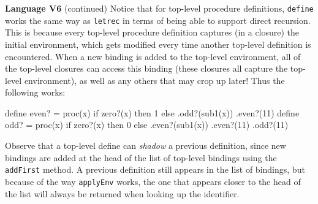 \begin{minipage}[t]{\sw}
\slidenumber
\LARGE
{\bf Language V6} (continued)\exx
Notice that for top-level procedure definitions,
\verb'define' works the same way as \verb'letrec'
in terms of being able to support direct recursion.
This is because every top-level procedure definition captures
(in a closure)
the initial environment,
which gets modified every time another top-level definition is encountered.
When a new binding is added to the top-level environment,
all of the top-level closures can access this binding
(these closures all capture the top-level environment),
as well as any others that may crop up later!
Thus the following works:
\begin{qv}
define even? = proc(x)
  if zero?(x) then 1 else .odd?(sub1(x))
.even?(11) %
define odd? = proc(x)
  if zero?(x) then 0 else .even?(sub1(x))
.even?(11) %
.odd?(11)  %
\end{qv}
\LARGE
Observe that a top-level define can {\em shadow} a previous definition,
since new bindings are added at the head of the list of top-level bindings
using the \verb'addFirst' method.
A previous definition still appears in the list of bindings,
but because of the way \verb'applyEnv' works,
the one that appears closer to the head of the list will always be returned
when looking up the identifier.
\end{minipage}
